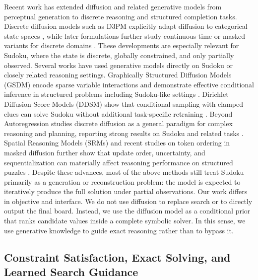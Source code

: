 \documentclass[lettersize,journal]{IEEEtran}
\begin{document}
Recent work has extended diffusion and related generative models from perceptual generation to discrete reasoning and structured completion tasks.
Discrete diffusion models such as D3PM explicitly adapt diffusion to categorical state spaces \cite{austin2021d3pm}, while later formulations further study continuous-time or masked variants for discrete domains \cite{campbell2022ctdd,kim2024tokenorder,garg2025learnedorder}.
These developments are especially relevant for Sudoku, where the state is discrete, globally constrained, and only partially observed.
Several works have used generative models directly on Sudoku or closely related reasoning settings.
Graphically Structured Diffusion Models (GSDM) encode sparse variable interactions and demonstrate effective conditional inference in structured problems including Sudoku-like settings \cite{weilbach2023gsdm}.
Dirichlet Diffusion Score Models (DDSM) show that conditional sampling with clamped clues can solve Sudoku without additional task-specific retraining \cite{avdeyev2023ddsm}.
Beyond Autoregression studies discrete diffusion as a general paradigm for complex reasoning and planning, reporting strong results on Sudoku and related tasks \cite{ye2025beyondar}.
Spatial Reasoning Models (SRMs) and recent studies on token ordering in masked diffusion further show that update order, uncertainty, and sequentialization can materially affect reasoning performance on structured puzzles \cite{wewer2025srm,kim2024tokenorder}.
Despite these advances, most of the above methods still treat Sudoku primarily as a generation or reconstruction problem: the model is expected to iteratively produce the full solution under partial observations.
Our work differs in objective and interface.
We do not use diffusion to replace search or to directly output the final board.
Instead, we use the diffusion model as a conditional prior that ranks candidate values inside a complete symbolic solver.
In this sense, we use generative knowledge to guide exact reasoning rather than to bypass it.

\subsection{Constraint Satisfaction, Exact Solving, and Learned Search Guidance}
\end{document}
